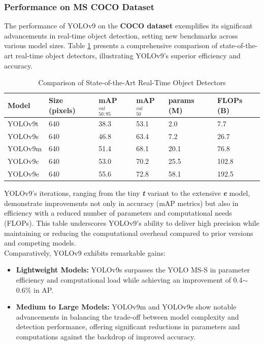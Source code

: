         \subsubsection{Performance on MS COCO Dataset}
            The performance of YOLOv9 on the \textbf{COCO dataset} exemplifies its significant advancements in real-time object detection, setting new benchmarks across various model sizes. Table \ref{tab:object-detector} presents a comprehensive comparison of state-of-the-art real-time object detectors, illustrating YOLOv9's superior efficiency and accuracy.
            \begin{table}[ht]
                \centering
                \small
                \begin{tabular}{| l | l | l | l | l | l |}
                    \hline
                    \rowcolor{lightgray} Model & Size (pixels) & mAP${^{val}_{50:95}}$ & mAP${^{val}_{50}}$ & params (M) & FLOPs (B) \\ \hline
                    YOLOv9t & 640 & 38.3 & 53.1 & 2.0 & 7.7 \\ \hline
                    YOLOv9s & 640 & 46.8 & 63.4 & 7.2 & 26.7 \\ \hline
                    YOLOv9m & 640 & 51.4 & 68.1 & 20.1 & 76.8 \\ \hline
                    YOLOv9c & 640 & 53.0 & 70.2 & 25.5 & 102.8 \\ \hline
                    YOLOv9e & 640 & 55.6 & 72.8 & 58.1 & 192.5 \\ \hline
                \end{tabular}
                \caption{Comparison of State-of-the-Art Real-Time Object Detectors}
                \label{tab:object-detector}
            \end{table}
            YOLOv9's iterations, ranging from the tiny \textbf{\textit{t}} variant to the extensive \textbf{\textit{e}} model, demonstrate improvements not only in accuracy (mAP metrics) but also in efficiency with a reduced number of parameters and computational needs (FLOPs). This table underscores YOLOv9's ability to deliver high precision while maintaining or reducing the computational overhead compared to prior versions and competing models. \\
            \vspace{3mm}
            Comparatively, YOLOv9 exhibits remarkable gains:
            \begin{itemize}
                \item \textbf{Lightweight Models:} YOLOv9s surpasses the YOLO MS-S in parameter efficiency and computational load while achieving an improvement of 0.4$\sim$0.6\% in AP.
                \item \textbf{Medium to Large Models:} YOLOv9m and YOLOv9e show notable advancements in balancing the trade-off between model complexity and detection performance, offering significant reductions in parameters and computations against the backdrop of improved accuracy.
            \end{itemize}
